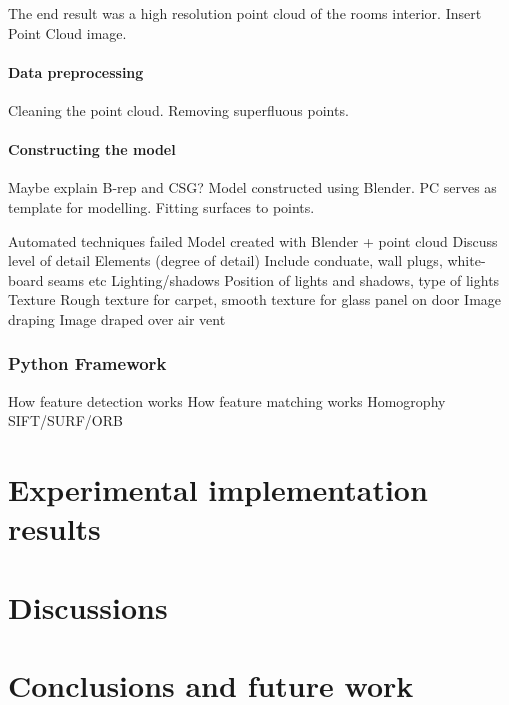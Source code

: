 \documentclass[11pt,a4paper]{report}
\begin{document}
				The end result was a high resolution point cloud of the rooms interior. {{Insert Point Cloud image}}.
				
			\subsubsection{Data preprocessing}
				Cleaning the point cloud.
				Removing superfluous points.
				
			\subsubsection{Constructing the model}
				Maybe explain B-rep and CSG?
				Model constructed using Blender.
				PC serves as template for modelling.
					Fitting surfaces to points.
				
			

			Automated techniques failed
			Model created with Blender + point cloud
			Discuss level of detail
				Elements (degree of detail)
					Include conduate, wall plugs, white-board seams etc
				Lighting/shadows
					Position of lights and shadows, type of lights
				Texture
					Rough texture for carpet, smooth texture for glass panel on door
				Image draping
					Image draped over air vent
		\subsection{Python Framework}
			How feature detection works
			How feature matching works
			Homogrophy
			SIFT/SURF/ORB
					

\chapter{Experimental implementation results}

\chapter{Discussions}

\chapter{Conclusions and future work}

\newpage
\printbibliography
\end{document}
